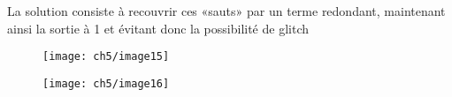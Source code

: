 La solution consiste à recouvrir ces «sauts» par un terme redondant, maintenant ainsi la sortie à 1 et évitant donc la possibilité de glitch\\
\begin{minipage}{.5\textwidth}
	\begin{figure}[H]
		\centering
		\texttt{[image: ch5/image15]}
	\end{figure}
\end{minipage}
\begin{minipage}{.5\textwidth}
	\begin{figure}[H]
		\centering
		\texttt{[image: ch5/image16]}
	\end{figure}
\end{minipage}